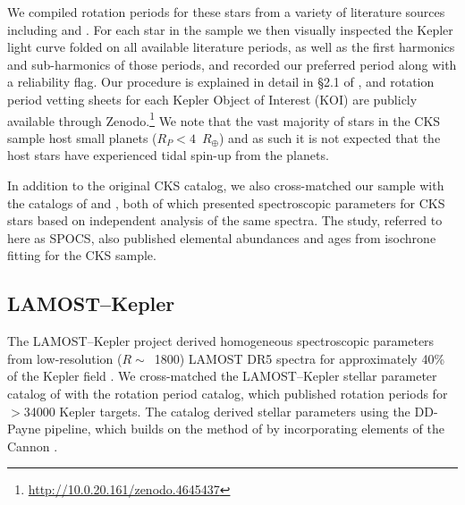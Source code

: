 \documentclass[twocolumn]{aastex631}
\newcommand{\teff}{\ensuremath{T_{\mathrm{eff}}}\xspace}
\newcommand{\prot}{\ensuremath{P_\mathrm{rot}}\xspace}
\newcommand{\rearth}{$R_\oplus$\xspace}
\begin{document}
We compiled rotation periods for these stars from a variety of literature sources including \citet{McQuillan2013, Mazeh2015} and \citet{Angus2018}. For each star in the sample we then visually inspected the Kepler light curve folded on all available literature periods, as well as the first harmonics and sub-harmonics of those periods, and recorded our preferred period along with a reliability flag. Our procedure is explained in detail in \S2.1 of \citet{David2021}, and rotation period vetting sheets for each Kepler Object of Interest (KOI) are publicly available through Zenodo.\footnote{\url{http://10.0.20.161/zenodo.4645437}} We note that the vast majority of stars in the CKS sample host small planets ($R_P < 4$~\rearth) and as such it is not expected that the host stars have experienced tidal spin-up from the planets.

In addition to the original CKS catalog, we also cross-matched our sample with the catalogs of \citet{Brewer2018} and \citet{Martinez2019}, both of which presented spectroscopic parameters for CKS stars based on independent analysis of the same spectra. The \citet{Brewer2018} study, referred to here as SPOCS, also published elemental abundances and ages from isochrone fitting for the CKS sample.

\iffalse
\begin{figure*}
    \centering
    \texttt{[image: ridge.pdf]}
    \caption{The \teff-\prot plane for the CKS sample. Point colors are scaled to the CKS ages determined from isochrone fitting. The source of \prot is denoted above each panel, where \citet{David2021} is a compilation of vetted periods, rather than a source of original measurements. The black trapezoid indicates the approximate area of the ridge. The grey curves indicate empirical cluster sequences from \citet{Curtis2020}, corresponding to ages of $\sim$2.7, 1, 0.67, and 0.12~Gyr from top to bottom.}
    \label{fig:ridge}
\end{figure*}
\fi 


\subsection{LAMOST--Kepler} \label{sec:lamost}
The LAMOST--Kepler project derived homogeneous spectroscopic parameters from low-resolution ($R\sim$~1800) LAMOST DR5 spectra for approximately 40\% of the Kepler field \citep{Zong2018, Xiang2019}. We cross-matched the LAMOST--Kepler stellar parameter catalog of \citet{Xiang2019} with the \citet{McQuillan2014} rotation period catalog, which published rotation periods for $>$34000 Kepler targets. The \citet{Xiang2019} catalog derived stellar parameters using the DD-Payne pipeline, which builds on the method of \citet{Ting2017b} by incorporating elements of the Cannon \citep{Ness2015}. 
\end{document}

